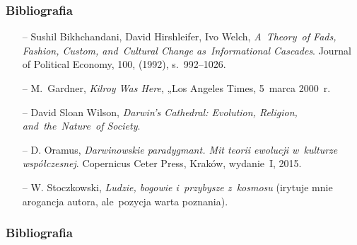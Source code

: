 \documentclass[10pt,t]{beamer}
\begin{document}
\begin{frame}
  \frametitle{Bibliografia}


  \begin{itemize}

  \item[--] Sushil Bikhchandani, David Hirshleifer, Ivo Welch,
    \textit{A~Theory~of Fads, Fashion, Custom, and~Cultural Change
      as~Informational Cascades}. Journal of Political Economy,
    100, (1992), s.~992--1026.

  \item[--] M.~Gardner, \textit{Kilroy Was Here}, „Los Angeles
    Times, 5~marca 2000~r.

  \item[--] David Sloan Wilson, \textit{Darwin's Cathedral: Evolution,
      Religion, and~the~Nature~of Society}.

  \item[--] D. Oramus, \textit{Darwinowskie paradygmant. Mit teorii
      ewolucji w~kulturze współczesnej}. Copernicus Ceter Press,
    Kraków, wydanie~I, 2015.

  \item[--] W. Stoczkowski, \emph{Ludzie, bogowie i~przybysze
      z~kosmosu} (irytuje mnie arogancja autora, ale~pozycja warta
    poznania).

  \end{itemize}

\end{frame}










\begin{frame}
  \frametitle{Bibliografia}


  

  {}

\end{frame}






\end{document}
